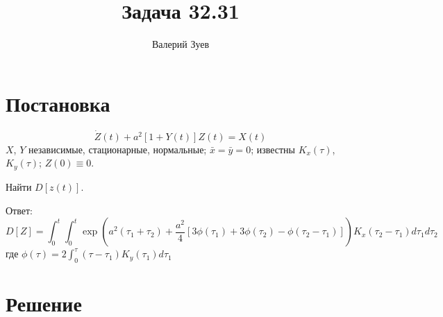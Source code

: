 \documentclass[a4paper,12pt]{article}
\begin{document}
\title{Задача 32.31}
\author{Валерий Зуев}
\maketitle

\section{Постановка}
\[ \dot Z(t) + a^2 [1 + Y(t)]Z(t) = X(t) \]
$X$, $Y$ независимые, стационарные, нормальные; $\bar x = \bar y = 0$;
известны $K_x(\tau)$, $K_y(\tau)$; $Z(0)\equiv0$.

Найти $D[z(t)]$.

\begin{leftbar}
    Ответ:
    \begin{equation} \label{eq:ans}
        D[Z] = \int_{0}^{t} \int_{0}^{t} \exp\left( a^2(\tau_1+\tau_2) + \frac{a^2}{4} [ 3 \phi(\tau_1) + 3 \phi(\tau_2) - \phi(\tau_2-\tau_1) ] \right) K_x(\tau_2 - \tau_1) d\tau_1 d\tau_2
    \end{equation}
    где $ \phi(\tau) = 2 \int_{0}^{\tau} (\tau - \tau_1) K_y(\tau_1) d \tau_1 $
\end{leftbar}

\section{Решение}
\end{document}
